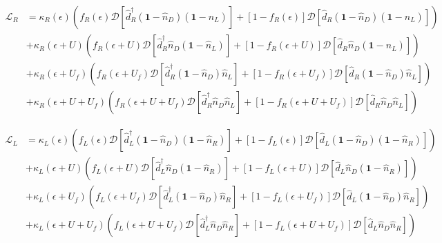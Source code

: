 \begin{align*}
    \mathcal{L}_{R} & = \kappa_{R}(\epsilon)(f_{R}(\epsilon)\mathcal{D}[\hat{d}^{\dagger}_{R}(\textbf{1}-\hat{n}_{D})(\textbf{1}-\hat{n}_{L}) ]  + [1-f_{R}(\epsilon)]\mathcal{D}[\hat{d}_{R}(\textbf{1}-\hat{n}_{D})(\textbf{1}-\hat{n}_{L}) ]  )  \\
                    & + \kappa_{R}(\epsilon+U)(f_{R}(\epsilon+U)\mathcal{D}[\hat{d}^{\dagger}_{R}\hat{n}_{D}(\textbf{1}-\hat{n}_{L}) ]  + [1-f_{R}(\epsilon+U)]\mathcal{D}[\hat{d}_{R}\hat{n}_{D}(\textbf{1}-\hat{n}_{L}) ]  ) \\
                   & + \kappa_{R}(\epsilon+U_{f})(f_{R}(\epsilon+U_{f})\mathcal{D}[\hat{d}^{\dagger}_{R}(\textbf{1}-\hat{n}_{D})\hat{n}_{L} ]  + [1-f_{R}(\epsilon+U_{f})]\mathcal{D}[\hat{d}_{R}(\textbf{1}-\hat{n}_{D})\hat{n}_{L} ]  ) \\
                  & + \kappa_{R}(\epsilon+U+U_{f})(f_{R}(\epsilon+U+U_{f})\mathcal{D}[\hat{d}^{\dagger}_{R}\hat{n}_{D}\hat{n}_{L} ]  + [1-f_{R}(\epsilon+U+U_{f})]\mathcal{D}[\hat{d}_{R}\hat{n}_{D}\hat{n}_{L} ]  ) 
\end{align*}

\begin{align*}
    \mathcal{L}_{L} & = \kappa_{L}(\epsilon)(f_{L}(\epsilon)\mathcal{D}[\hat{d}^{\dagger}_{L}(\textbf{1}-\hat{n}_{D})(\textbf{1}-\hat{n}_{R}) ]  + [1-f_{L}(\epsilon)]\mathcal{D}[\hat{d}_{L}(\textbf{1}-\hat{n}_{D})(\textbf{1}-\hat{n}_{R}) ]  )  \\
                    & + \kappa_{L}(\epsilon+U)(f_{L}(\epsilon+U)\mathcal{D}[\hat{d}^{\dagger}_{L}\hat{n}_{D}(\textbf{1}-\hat{n}_{R}) ]  + [1-f_{L}(\epsilon+U)]\mathcal{D}[\hat{d}_{L}\hat{n}_{D}(\textbf{1}-\hat{n}_{R}) ]  ) \\
                   & + \kappa_{L}(\epsilon+U_{f})(f_{L}(\epsilon+U_{f})\mathcal{D}[\hat{d}^{\dagger}_{L}(\textbf{1}-\hat{n}_{D})\hat{n}_{R} ]  + [1-f_{L}(\epsilon+U_{f})]\mathcal{D}[\hat{d}_{L}(\textbf{1}-\hat{n}_{D})\hat{n}_{R} ]  ) \\
                  & + \kappa_{L}(\epsilon+U+U_{f})(f_{L}(\epsilon+U+U_{f})\mathcal{D}[\hat{d}^{\dagger}_{L}\hat{n}_{D}\hat{n}_{R} ]  + [1-f_{L}(\epsilon+U+U_{f})]\mathcal{D}[\hat{d}_{L}\hat{n}_{D}\hat{n}_{R} ]  ) 
\end{align*}

